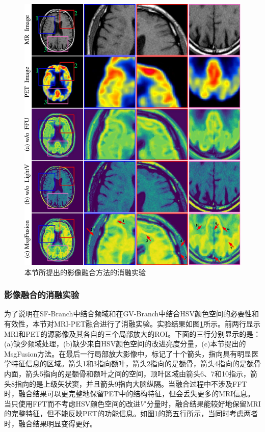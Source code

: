    \begin{figure}[htbp]
      \centering
          \includegraphics[width=0.8\columnwidth]{figs/paper1noHSVnoFourier_MAD015.pdf}
          \caption{本节所提出的影像融合方法的消融实验}\label{paper1noHSVnoFourier}
     \end{figure}
     
\subsubsection{影像融合的消融实验}
为了说明在SF-Branch中结合频域和在GV-Branch中结合HSV颜色空间的必要性和有效性，本节对MRI-PET融合进行了消融实验。实验结果如图\ref{paper1noHSVnoFourier}所示。前两行显示MRI和PET的源影像及其各自的三个局部放大的ROI。下面的三行分别显示的是：(a)缺少频域处理，(b)缺少来自HSV颜色空间的改进亮度分量，(c)本节提出的MsgFusion方法。在最后一行局部放大影像中，标记了十个箭头，指向具有明显医学特征信息的区域。箭头1和3指向额叶，箭头2指向的是额骨，箭头4指向的是额骨内面，箭头5指向的是额骨和额叶之间的空间，顶叶区域由箭头6、7和10指示，箭头8指向的是上级矢状窦，并且箭头9指向大脑纵隔。当融合过程中不涉及FFT时，融合结果可以更完整地保留PET中的结构特征，但会丢失更多的MRI信息。当只使用FFT而不考虑HSV颜色空间的改进$V'$分量时，融合结果能较好地保留MRI的完整特征，但不能反映PET的功能信息。如图\ref{paper1noHSVnoFourier}的第五行所示，当同时考虑两者时，融合结果明显变得更好。

